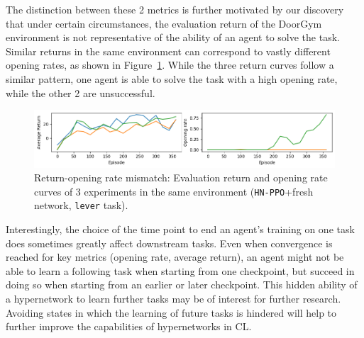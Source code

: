 \documentclass[dvipsnames]{article} %
\newcommand{\commentOLD}[1]{}
\newcommand{\saOLD}[1] {\commentOLD{{\color{cyan} SA: #1}}}                %
\newcommand{\jhOLD}[1] {\commentOLD{{\color{RawSienna} JH: #1}}}           %
\newcommand{\asOLD}[1] {\commentOLD{{\color{orange} AS: #1}}}              %
\begin{document}
The distinction between these 2 metrics is further motivated by our discovery that under certain circumstances, the evaluation return of the DoorGym environment is not representative of the ability of an agent to solve the task. Similar returns in the same environment can correspond to vastly different opening rates, as shown in Figure~\ref{fig:return_opening_rate}. While the three return curves follow a similar pattern, one agent is able to solve the task with a high opening rate, while the other 2 are unsuccessful.

\begin{figure}[htbp]
\begin{center}
\includegraphics[width=1.0\linewidth]{images/return_opening_rate.png}
\end{center}
\caption{Return-opening rate mismatch: Evaluation return and opening rate curves of 3 experiments in the same environment (\texttt{HN-PPO}+fresh network, \texttt{lever} task).}
\label{fig:return_opening_rate}
\end{figure}

Interestingly, the choice of the time point to end an agent's training on one task does sometimes greatly affect downstream tasks. Even when convergence is reached for key metrics (opening rate, average return), an agent might not be able to learn a following task when starting from one checkpoint, but succeed in doing so when starting from an earlier or later checkpoint. This hidden ability of a hypernetwork to learn further tasks may be of interest for further research. Avoiding states in which the learning of future tasks is hindered will help to further improve the capabilities of hypernetworks in CL.
\end{document}
